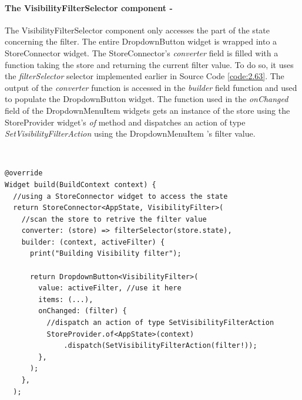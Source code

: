 \paragraph{The VisibilityFilterSelector component - }
\label{subpar:todo_app_bloc_core_state}
The VisibilityFilterSelector component only accesses the part of the state concerning the filter. The entire DropdownButton widget is wrapped into a StoreConnector widget. The StoreConnector’s \textit{converter} field  is filled with a function taking the store and returning the current filter value. To do so, it uses the \textit{filterSelector} selector implemented earlier in Source Code \ref{code:2.63}. The output of the \textit{converter} function is accessed in the \textit{builder} field function and used to populate the DropdownButton widget. The function used in the \textit{onChanged} field of the DropdownMenuItem widgets gets an instance of the store using the StoreProvider widget’s \textit{of} method and dispatches an action of type \textit{SetVisibilityFilterAction} using the DropdownMenuItem 's filter value.
\begin{code}
\mbox{}\\
 \mbox{}
		\label{code:2.14}
\begin{verbatim}
@override
Widget build(BuildContext context) {
  //using a StoreConnector widget to access the state
  return StoreConnector<AppState, VisibilityFilter>(
    //scan the store to retrive the filter value
    converter: (store) => filterSelector(store.state),
    builder: (context, activeFilter) {
      print("Building Visibility filter");

      return DropdownButton<VisibilityFilter>(
        value: activeFilter, //use it here
        items: (...),
        onChanged: (filter) {
          //dispatch an action of type SetVisibilityFilterAction
          StoreProvider.of<AppState>(context)
              .dispatch(SetVisibilityFilterAction(filter!));
        },
      );
    },
  );
\end{verbatim}
\mbox{}
\end{code}

